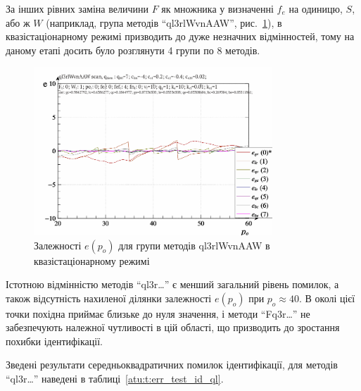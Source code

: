За інших рівних заміна величини
$ F $ як множника у визначенні
$ f_e $ на одиницю,
$ S $, або ж
$ W $ (наприклад, група методів ``ql3rlWvnAAW'', рис.~\ref{atu:f:ql3rlWvnAAW_scan}),
в квазістаціонарному режимі призводить до дуже незначних
відмінностей, тому на даному етапі досить було розглянути 4
групи по 8 методів.

\begin{figure}[htb!]
  \begin{center}
    \includegraphics[width=0.8\textwidth]{p/scan/qls-p_p_e_ql3rlWvnAAW_scan.png}
  \end{center}
  \caption{Залежності $e(p_o)$ для групи методів ql3rlWvnAAW в квазістаціонарному режимі}
  \label{atu:f:ql3rlWvnAAW_scan}
\end{figure}

Істотною відмінністю методів ``ql3r\ldots'' є менший загальний рівень
помилок, а також відсутність нахиленої ділянки залежності $e (p_o)$ при
$p_o \approx 40$. В околі цієї точки похідна приймає близьке до нуля значення, і
методи ``Fq3r\ldots'' не забезпечують належної чутливості в цій області, що
призводить до зростання похибки ідентифікації.


Зведені результати середньоквадратичних помилок ідентифікації,
для методів ``ql3r\ldots'' наведені в таблиці~\ref{atu:t:err_test_id_ql}.


